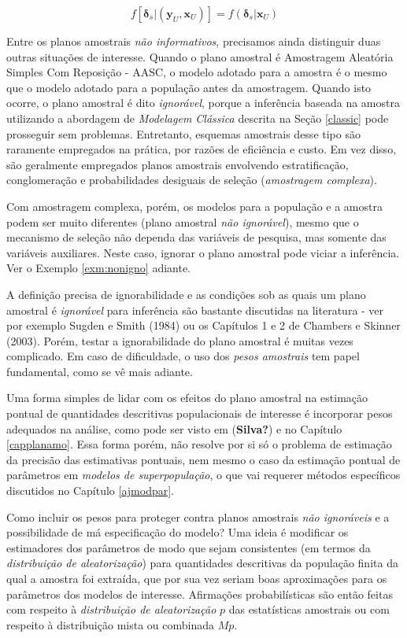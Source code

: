 \documentclass[
  12pt,
  brazilian,
]{book}
\theoremstyle{definition}
\theoremstyle{definition}
\theoremstyle{definition}
\theoremstyle{definition}
\theoremstyle{remark}
\begin{document}
\begin{equation}
f\left[ \mathbf{\delta }_s | \left( \mathbf{y}_U , \mathbf{x}_U \right)
\right] = f\left( \mathbf{\delta }_s | \mathbf{x}_U \right) \label{eq:ref8}
\end{equation}

Entre os planos amostrais \emph{não informativos}, precisamos ainda distinguir duas
outras situações de interesse. Quando o plano amostral é Amostragem Aleatória
Simples Com Reposição - AASC, o modelo adotado para a amostra é o mesmo que o
modelo adotado para a população antes da amostragem. Quando isto ocorre, o plano
amostral é dito \emph{ignorável}, porque a inferência baseada na amostra utilizando a
abordagem de \emph{Modelagem Clássica} descrita na Seção \ref{classic} pode prosseguir sem
problemas. Entretanto, esquemas amostrais desse tipo são raramente empregados na
prática, por razões de eficiência e custo. Em vez disso, são geralmente
empregados planos amostrais envolvendo estratificação, conglomeração e
probabilidades desiguais de seleção (\emph{amostragem complexa}).

Com amostragem complexa, porém, os modelos para a população e a amostra podem
ser muito diferentes (plano amostral \emph{não ignorável}), mesmo que o mecanismo de
seleção não dependa das variáveis de pesquisa, mas somente das variáveis
auxiliares. Neste caso, ignorar o plano amostral pode viciar a inferência. Ver
o Exemplo \ref{exm:nonigno} adiante.

A definição precisa de ignorabilidade e as condições sob as quais um plano
amostral é \emph{ignorável} para inferência são bastante discutidas na literatura -
ver por exemplo Sugden e Smith (1984) ou os Capítulos 1 e 2 de Chambers e Skinner (2003). Porém, testar
a ignorabilidade do plano amostral é muitas vezes complicado. Em caso de
dificuldade, o uso dos \emph{pesos amostrais} tem papel fundamental, como se vê
mais adiante.

Uma forma simples de lidar com os efeitos do plano amostral na estimação pontual
de quantidades descritivas populacionais de interesse é incorporar pesos
adequados na análise, como pode ser visto em (\textbf{Silva?}) e no Capítulo \ref{capplanamo}.
Essa forma porém, não resolve por si só o problema de estimação da precisão das
estimativas pontuais, nem mesmo o caso da estimação pontual de parâmetros em
\emph{modelos de superpopulação}, o que vai requerer métodos específicos discutidos no Capítulo \ref{ajmodpar}.

Como incluir os pesos para proteger contra planos amostrais \emph{não ignoráveis} e a
possibilidade de má especificação do modelo? Uma ideia é modificar os estimadores
dos parâmetros de modo que sejam consistentes (em termos da \emph{distribuição de aleatorização})
para quantidades descritivas da população finita da qual a amostra foi extraída, que
por sua vez seriam boas aproximações para os parâmetros dos modelos de interesse. Afirmações
probabilísticas são então feitas com respeito à \emph{distribuição de aleatorização} \(p\) das
estatísticas amostrais ou com respeito à distribuição mista ou combinada \(Mp\).
\end{document}
